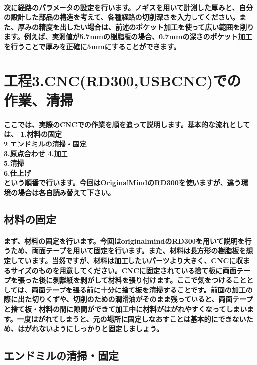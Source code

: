 \documentclass[b5paper, 9pt, twocolumn, titlepage,openany]{jsbook}%
\begin{document}
\paragraph{次に経路のパラメータの設定を行います。ノギスを用いて計測した厚みと、自分の設計した部品の構造を考えて、各種経路の切削深さを入力してください。また、厚みの精度を出したい場合は、前述のポケット加工を使って広い範囲を削ります。例えば、実測値が5.7mmの樹脂板の場合、0.7mmの深さのポケット加工を行うことで厚みを正確に5mmにすることができます。}

\section{工程3.CNC(RD300,USBCNC)での作業、清掃}
\paragraph{ここでは、実際のCNCでの作業を順を追って説明します。基本的な流れとしては、
1.材料の固定\\
2.エンドミルの清掃・固定\\
3.原点合わせ
4.加工\\
5.清掃\\
6.仕上げ\\
という順番で行います。今回はOriginalMindのRD300を使いますが、違う環境の場合は各自読み替えて下さい。}
\subsection{材料の固定}
\paragraph{まず、材料の固定を行います。今回はoriginalmindのRD300を用いて説明を行うため、両面テープを用いて固定を行います。また、材料は長方形の樹脂板を想定しています。当然ですが、材料は加工したいパーツより大きく、CNCに収まるサイズのものを用意してください。CNCに固定されている捨て板に両面テープを張った後に剥離紙を剥がして材料を張り付けます。ここで気をつけることとしては、両面テープを張る前に十分に捨て板を清掃することです。前回の加工の際に出た切りくずや、切削のための潤滑油がそのまま残っていると、両面テープと捨て板・材料の間に隙間ができて加工中に材料がはがれやすくなってしまいます。一度はがれてしまうと、元の場所に固定しなおすことは基本的にできないため、はがれないようにしっかりと固定しましょう。}

\subsection{エンドミルの清掃・固定}
\end{document}
